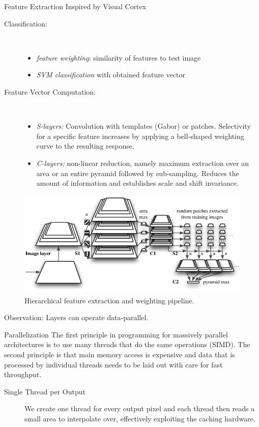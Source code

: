\documentclass[final]{beamer}
\begin{document}
\begin{frame}{}
\begin{columns}[t]
\begin{column}{.48\linewidth}
\begin{block} {Feature Extraction Inspired by Visual Cortex}
\begin{description}
\item[Classification:]~
\begin{itemize}
	\item  \emph{feature weighting}: similarity of features to test image
	\item  \emph{SVM classification} with obtained feature vector
\end{itemize}

\item[Feature Vector Computation:]~ %
\begin{itemize}
\item
\emph{S-layers:} Convolution with templates (Gabor) or patches.
Selectivity for a specific feature increases by applying a bell-shaped weighting curve to the resulting response.
\item \emph{C-layers:} non-linear reduction, namely maximum
  extraction over an area or an entire pyramid followed by
  sub-sampling. Reduces the amount of information and establishes
 scale and shift invariance.\newline
\end{itemize}
\end{description}

\begin{figure}[tb]
\centering
\includegraphics[width=.7\linewidth]{images/pyramidp}
\caption{
  Hierarchical feature extraction and weighting pipeline.
}
\label{fig:pyramid}
\end{figure}
Observation: Layers can operate data-parallel.
        \end{block}
        \begin{block}{Parallelization}
The first principle in programming for massively parallel architectures is to use many threads that do the same operations (SIMD). The second principle is that main memory access is expensive and data that is processed by individual threads needs to be laid out with care for fast throughput. 
\begin{description}
\item[ Single Thread per Output] 
We create one thread for every output pixel and each thread
then reads a small area to interpolate over, effectively exploiting
the caching hardware.


\end{description}
\end{block}
\end{column}
\end{columns}
\end{frame}
\end{document}
